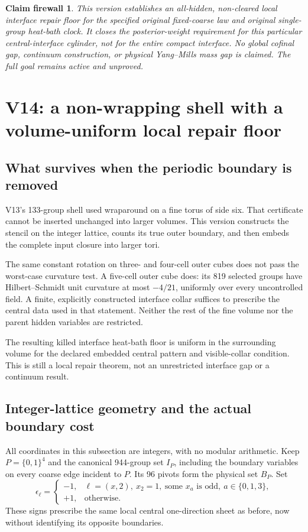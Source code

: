 \documentclass[11pt,oneside]{article}
\newtheorem{firewall}[theorem]{Claim firewall}
\begin{document}
\begin{firewall}
This version establishes an all-hidden,
non-cleared local interface repair
floor for the specified original
fixed-coarse law and original
single-group heat-bath clock.
It closes the posterior-weight
requirement for this particular
central-interface cylinder, not for
the entire compact interface.
No global cofinal gap, continuum
construction, or physical Yang--Mills
mass gap is claimed. The full goal
remains active and unproved.
\end{firewall}
\section{V14: a non-wrapping shell with a volume-uniform local repair floor}
\label{sec:f13v14}

\subsection{What survives when the periodic boundary is removed}

V13's 133-group shell used wraparound on a fine torus
of side six. That certificate cannot be inserted
unchanged into larger volumes. This version constructs
the stencil on the integer lattice, counts its true
outer boundary, and then embeds the complete input
closure into larger tori.

The same constant rotation on three- and four-cell
outer cubes does not pass the worst-case curvature
test. A five-cell outer cube does: its 819 selected
groups have Hilbert--Schmidt unit curvature at most
\(-4/21\), uniformly over every uncontrolled field.
A finite, explicitly constructed interface collar
suffices to prescribe the central data used in that
statement. Neither the rest of the fine volume nor
the parent hidden variables are restricted.

The resulting killed interface heat-bath floor is
uniform in the surrounding volume for the declared
embedded central pattern and visible-collar condition.
This is still a local repair theorem, not an
unrestricted interface gap or a continuum result.

\subsection{Integer-lattice geometry and the actual boundary cost}

All coordinates in this subsection are integers,
with no modular arithmetic. Keep
\(P=\{0,1\}^4\) and the canonical 944-group set
\(I_P\), including the boundary variables on
every coarse edge incident to \(P\). Its 96
pivots form the physical set \(B_P\). Set
\[
 \epsilon_\ell=
 \begin{cases}
 -1,&\ell=(x,2),\ x_2=1,\
                      \text{some }x_a\text{ is odd},\ a\in\{0,1,3\},\\
 +1,&\text{otherwise}.
 \end{cases}
\]
These signs prescribe the same local central
one-direction sheet as before, now without
identifying its opposite boundaries.
\end{document}
